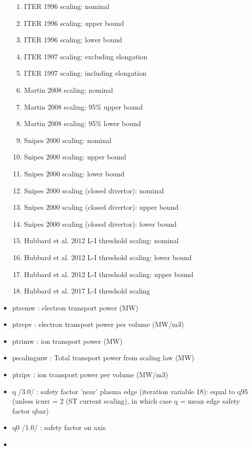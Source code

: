 \documentclass[]{article}
\providecommand{\tightlist}{%
  \setlength{\itemsep}{0pt}\setlength{\parskip}{0pt}}
\begin{document}
\begin{itemize}
  \begin{enumerate}
  \tightlist
  \item
    ITER 1996 scaling: nominal
  \item
    ITER 1996 scaling: upper bound
  \item
    ITER 1996 scaling: lower bound
  \item
    ITER 1997 scaling: excluding elongation
  \item
    ITER 1997 scaling: including elongation
  \item
    Martin 2008 scaling: nominal
  \item
    Martin 2008 scaling: 95\% upper bound
  \item
    Martin 2008 scaling: 95\% lower bound
  \item
    Snipes 2000 scaling: nominal
  \item
    Snipes 2000 scaling: upper bound
  \item
    Snipes 2000 scaling: lower bound
  \item
    Snipes 2000 scaling (closed divertor): nominal
  \item
    Snipes 2000 scaling (closed divertor): upper bound
  \item
    Snipes 2000 scaling (closed divertor): lower bound
  \item
    Hubbard et al. 2012 L-I threshold scaling: nominal
  \item
    Hubbard et al. 2012 L-I threshold scaling: lower bound
  \item
    Hubbard et al. 2012 L-I threshold scaling: upper bound
  \item
    Hubbard et al. 2017 L-I threshold scaling
  \end{enumerate}
\item
  ptremw : electron transport power (MW)
\item
  ptrepv : electron transport power per volume (MW/m3)
\item
  ptrimw : ion transport power (MW)
\item
  pscalingmw : Total transport power from scaling law (MW)
\item
  ptripv : ion transport power per volume (MW/m3)
\item
  q /3.0/ : safety factor 'near' plasma edge (iteration variable 18):
  equal to q95 (unless icurr = 2 (ST current scaling), in which case q =
  mean edge safety factor qbar)
\item
  q0 /1.0/ : safety factor on axis
\item

\end{itemize}
\end{document}
